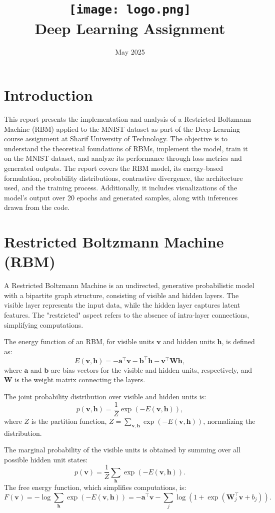 \documentclass{article}
\title{
    \texttt{[image: logo.png]} \\
    Deep Learning Assignment \\ \exerciseset
}
\author{\FirstAuthor}
\date{May 2025}
\begin{document}
\maketitle

\section*{Introduction}
This report presents the implementation and analysis of a Restricted Boltzmann Machine (RBM) applied to the MNIST dataset as part of the Deep Learning course assignment at Sharif University of Technology. The objective is to understand the theoretical foundations of RBMs, implement the model, train it on the MNIST dataset, and analyze its performance through loss metrics and generated outputs. The report covers the RBM model, its energy-based formulation, probability distributions, contrastive divergence, the architecture used, and the training process. Additionally, it includes visualizations of the model's output over 20 epochs and generated samples, along with inferences drawn from the code.

\section{Restricted Boltzmann Machine (RBM)}
A Restricted Boltzmann Machine is an undirected, generative probabilistic model with a bipartite graph structure, consisting of visible and hidden layers. The visible layer represents the input data, while the hidden layer captures latent features. The "restricted" aspect refers to the absence of intra-layer connections, simplifying computations.

The energy function of an RBM, for visible units \( \mathbf{v} \) and hidden units \( \mathbf{h} \), is defined as:
\[
E(\mathbf{v}, \mathbf{h}) = -\mathbf{a}^\top \mathbf{v} - \mathbf{b}^\top \mathbf{h} - \mathbf{v}^\top \mathbf{W} \mathbf{h},
\]
where \( \mathbf{a} \) and \( \mathbf{b} \) are bias vectors for the visible and hidden units, respectively, and \( \mathbf{W} \) is the weight matrix connecting the layers.

The joint probability distribution over visible and hidden units is:
\[
p(\mathbf{v}, \mathbf{h}) = \frac{1}{Z} \exp(-E(\mathbf{v}, \mathbf{h})),
\]
where \( Z \) is the partition function, \( Z = \sum_{\mathbf{v}, \mathbf{h}} \exp(-E(\mathbf{v}, \mathbf{h})) \), normalizing the distribution.

The marginal probability of the visible units is obtained by summing over all possible hidden unit states:
\[
p(\mathbf{v}) = \frac{1}{Z} \sum_{\mathbf{h}} \exp(-E(\mathbf{v}, \mathbf{h})).
\]
The free energy function, which simplifies computations, is:
\[
F(\mathbf{v}) = -\log \sum_{\mathbf{h}} \exp(-E(\mathbf{v}, \mathbf{h})) = -\mathbf{a}^\top \mathbf{v} - \sum_j \log(1 + \exp(\mathbf{W}_j^\top \mathbf{v} + b_j)).
\]
\end{document}
